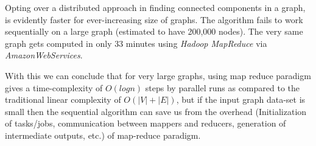 Opting over a distributed approach in finding connected components in a graph, is evidently faster for ever-increasing size of graphs. The algorithm fails to work sequentially on a large graph (estimated to have 200,000 nodes). The very same graph gets computed in only 33 minutes using \textit{Hadoop MapReduce} via \textit{AmazonWebServices}.

With this we can conclude that for very large graphs, using map reduce paradigm gives a time-complexity of \textit{$O(logn)$} steps by parallel runs as compared to the traditional linear complexity of \textit{$O(|V| + |E|)$}, but if the input graph data-set is small then the sequential algorithm can save us from the overhead  (\eg Initialization of tasks/jobs, communication between mappers and reducers, generation of intermediate outputs, etc.) of map-reduce paradigm.